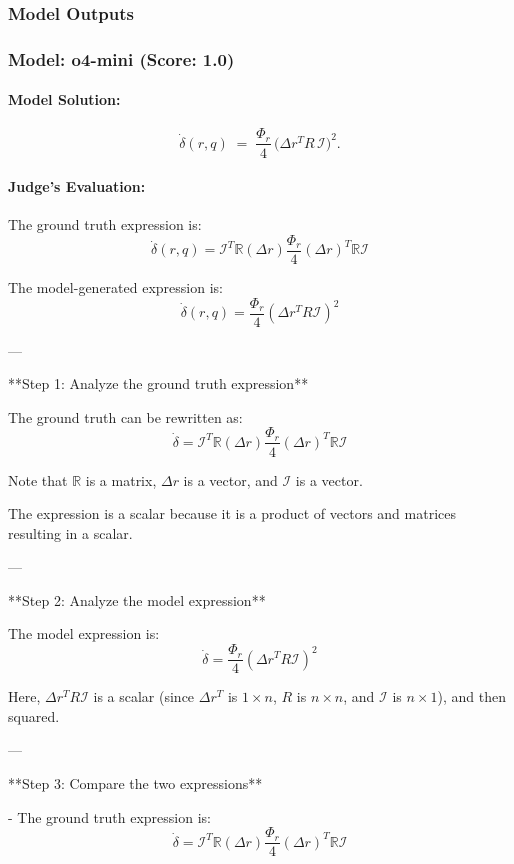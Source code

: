 \documentclass[10pt]{article}
\begin{document}
\subsubsection*{Model Outputs}
\subsubsection*{Model: o4-mini (Score: 1.0)}
\paragraph*{Model Solution:}
\[ \dot\delta(r,q)\;=\;\frac{\Phi_r}{4}\,\bigl(\Delta r^{T}R\,\mathcal I\bigr)^{2}. \]

\paragraph*{Judge's Evaluation:}

The ground truth expression is:
\[
\dot{\delta}(r,q) = \mathcal{I}^T \mathbb{R} (\Delta r) \frac{\Phi_r}{4} (\Delta r)^T \mathbb{R} \mathcal{I}
\]

The model-generated expression is:
\[
\dot{\delta}(r,q) = \frac{\Phi_r}{4} \left(\Delta r^{T} R \mathcal{I}\right)^2
\]

---

**Step 1: Analyze the ground truth expression**

The ground truth can be rewritten as:
\[
\dot{\delta} = \mathcal{I}^T \mathbb{R} (\Delta r) \frac{\Phi_r}{4} (\Delta r)^T \mathbb{R} \mathcal{I}
\]

Note that $\mathbb{R}$ is a matrix, $\Delta r$ is a vector, and $\mathcal{I}$ is a vector.

The expression is a scalar because it is a product of vectors and matrices resulting in a scalar.

---

**Step 2: Analyze the model expression**

The model expression is:
\[
\dot{\delta} = \frac{\Phi_r}{4} \left(\Delta r^{T} R \mathcal{I}\right)^2
\]

Here, $\Delta r^{T} R \mathcal{I}$ is a scalar (since $\Delta r^{T}$ is $1 \times n$, $R$ is $n \times n$, and $\mathcal{I}$ is $n \times 1$), and then squared.

---

**Step 3: Compare the two expressions**

- The ground truth expression is:
\[
\dot{\delta} = \mathcal{I}^T \mathbb{R} (\Delta r) \frac{\Phi_r}{4} (\Delta r)^T \mathbb{R} \mathcal{I}
\]
\end{document}
